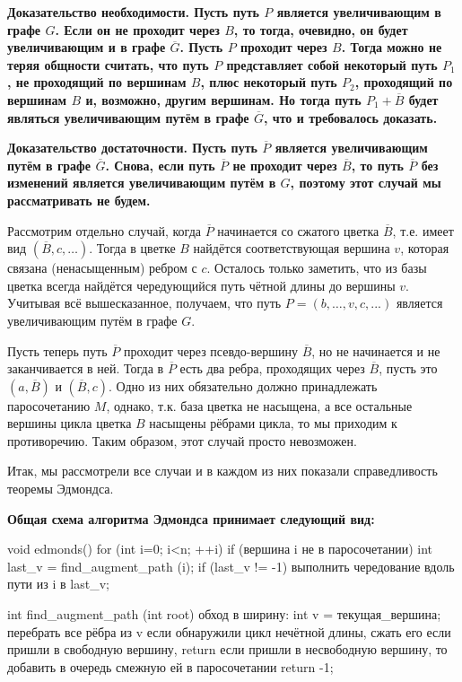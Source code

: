 \bf{Доказательство необходимости}. Пусть путь $P$ является увеличивающим в графе $G$. Если он не проходит через $B$, то тогда, очевидно, он будет увеличивающим и в графе $\overline G$. Пусть $P$ проходит через $B$. Тогда можно не теряя общности считать, что путь $P$ представляет собой некоторый путь $P_1$, не проходящий по вершинам $B$, плюс некоторый путь $P_2$, проходящий по вершинам $B$ и, возможно, другим вершинам. Но тогда путь $P_1 + \overline B$ будет являться увеличивающим путём в графе $\overline G$, что и требовалось доказать.

\bf{Доказательство достаточности}. Пусть путь $\overline P$ является увеличивающим путём в графе $\overline G$. Снова, если путь $\overline P$ не проходит через $\overline B$, то путь $\overline P$ без изменений является увеличивающим путём в $G$, поэтому этот случай мы рассматривать не будем.

Рассмотрим отдельно случай, когда $\overline P$ начинается со сжатого цветка $\overline B$, т.е. имеет вид $(\overline B, c, \ldots)$. Тогда в цветке $B$ найдётся соответствующая вершина $v$, которая связана (ненасыщенным) ребром с $c$. Осталось только заметить, что из базы цветка всегда найдётся чередующийся путь чётной длины до вершины $v$. Учитывая всё вышесказанное, получаем, что путь $P = (b, \ldots, v, c, ...)$ является увеличивающим путём в графе $G$.

Пусть теперь путь $\overline P$ проходит через псевдо-вершину $\overline B$, но не начинается и не заканчивается в ней. Тогда в $\overline P$ есть два ребра, проходящих через $\overline B$, пусть это $(a, \overline B)$ и $(\overline B, c)$. Одно из них обязательно должно принадлежать паросочетанию $M$, однако, т.к. база цветка не насыщена, а все остальные вершины цикла цветка $B$ насыщены рёбрами цикла, то мы приходим к противоречию. Таким образом, этот случай просто невозможен.

Итак, мы рассмотрели все случаи и в каждом из них показали справедливость теоремы Эдмондса.

\bf{Общая схема алгоритма Эдмондса} принимает следующий вид:

\code
void edmonds() {
	for (int i=0; i<n; ++i)
		if (вершина i не в паросочетании) {
			int last_v = find_augment_path (i);
			if (last_v != -1)
				выполнить чередование вдоль пути из i в last_v;
		}
}

int find_augment_path (int root) {
	обход в ширину:
		int v = текущая_вершина;
		перебрать все рёбра из v
			если обнаружили цикл нечётной длины, сжать его
			если пришли в свободную вершину, return
			если пришли в несвободную вершину, то добавить
				в очередь смежную ей в паросочетании
	return -1;
}
\endcode


